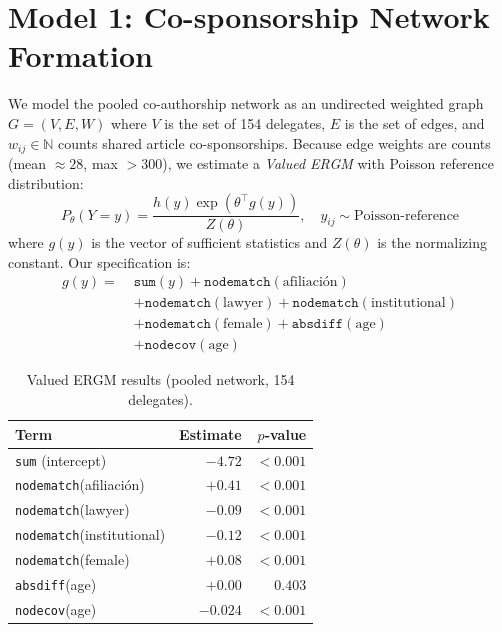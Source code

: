 \documentclass[11pt,a4paper]{article}
\begin{document}
\section{Model 1: Co-sponsorship Network Formation}

We model the pooled co-authorship network as an undirected weighted graph $G = (V, E, W)$ where $V$ is the set of 154 delegates, $E$ is the set of edges, and $w_{ij} \in \mathbb{N}$ counts shared article co-sponsorships. Because edge weights are counts (mean $\approx 28$, max $> 300$), we estimate a \emph{Valued ERGM} \citep{krivitsky2012exponential} with Poisson reference distribution:
\begin{equation}
  P_\theta(Y = y) = \frac{h(y) \exp\left(\theta^{\top} g(y)\right)}{Z(\theta)}, \quad y_{ij} \sim \text{Poisson-reference}
\end{equation}
where $g(y)$ is the vector of sufficient statistics and $Z(\theta)$ is the normalizing constant. Our specification is:
\begin{equation}
  \begin{split}
    g(y) = \; & \texttt{sum}(y) + \texttt{nodematch}(\text{afiliaci\'on}) \\
              & + \texttt{nodematch}(\text{lawyer}) + \texttt{nodematch}(\text{institutional}) \\
              & + \texttt{nodematch}(\text{female}) + \texttt{absdiff}(\text{age}) \\
              & + \texttt{nodecov}(\text{age})
  \end{split}
\end{equation}

\begin{table}[H]
\centering
\caption{Valued ERGM results (pooled network, 154 delegates).}
\label{tab:ergm}
\begin{tabular}{lrr}
\toprule
Term & Estimate & $p$-value \\
\midrule
\texttt{sum} (intercept)            & $-4.72$  & $<0.001$ \\
\texttt{nodematch}(afiliaci\'on)    & $+0.41$  & $<0.001$ \\
\texttt{nodematch}(lawyer)          & $-0.09$  & $<0.001$ \\
\texttt{nodematch}(institutional)   & $-0.12$  & $<0.001$ \\
\texttt{nodematch}(female)          & $+0.08$  & $<0.001$ \\
\texttt{absdiff}(age)               & $+0.00$  & $0.403$  \\
\texttt{nodecov}(age)               & $-0.024$ & $<0.001$ \\
\bottomrule
\end{tabular}
\end{table}
\end{document}
